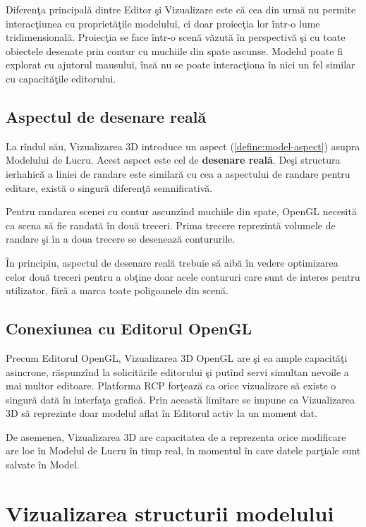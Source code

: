 Diferenţa principală dintre Editor şi Vizualizare este că cea din urmă nu 
permite interacţiunea cu proprietăţile modelului, ci doar proiecţia lor într-o 
lume tridimensională. Proiecţia se face într-o scenă văzută în perspectivă şi 
cu toate obiectele desenate prin contur cu muchiile din spate ascunse. Modelul 
poate fi explorat cu ajutorul mausului, însă nu se poate interacţiona în nici 
un fel similar cu capacităţile editorului.

\subsection{Aspectul de desenare reală}

La rîndul său, Vizualizarea 3D introduce un aspect (\ref{define:model-aspect}) 
asupra Modelului de Lucru. Acest aspect este cel de \textbf{desenare reală}. 
Deşi structura ierhahică a liniei de randare este similară cu cea a aspectului 
de randare pentru editare, există o singură diferenţă semnificativă.

Pentru randarea scenei cu contur ascunzînd muchiile din spate, OpenGL necesită 
ca scena să fie randată în două treceri. Prima trecere reprezintă volumele de 
randare şi în a doua trecere se desenează contururile.

În principiu, aspectul de desenare reală trebuie să aibă în vedere optimizarea 
celor două treceri pentru a obţine doar acele contururi care sunt de interes 
pentru utilizator, fără a marca toate poligoanele din scenă.

\subsection{Conexiunea cu Editorul OpenGL}

Precum Editorul OpenGL, Vizualizarea 3D OpenGL are şi ea ample capacităţi 
asincrone, răspunzînd la solicitările editorului şi putînd servi simultan 
nevoile a mai multor editoare. Platforma RCP forţează ca orice vizualizare să 
existe o singură dată în interfaţa grafică. Prin această limitare se impune ca 
Vizualizarea 3D să reprezinte doar modelul aflat în Editorul activ la un moment 
dat.

De asemenea, Vizualizarea 3D are capacitatea de a reprezenta orice modificare
are loc în Modelul de Lucru în timp real, în momentul în care datele parţiale
sunt salvate în Model.

\section{Vizualizarea structurii modelului}

